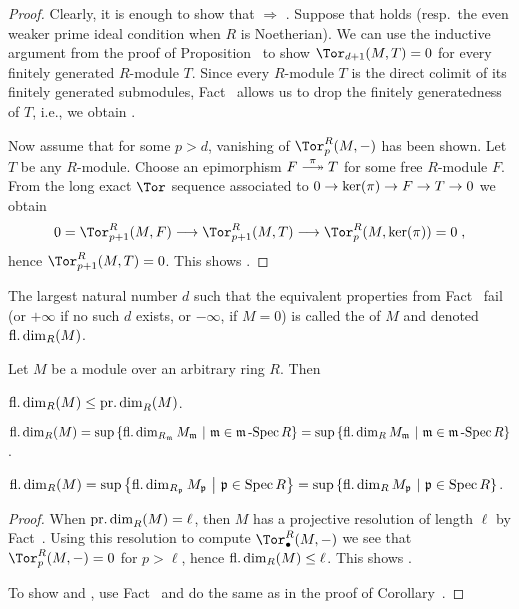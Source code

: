 \documentclass[a4paper,parskip=half,numbers=enddot, DIV=12]{scrreprt}
\begin{document}
\begin{proof}
	Clearly, it is enough to show that  $\Rightarrow$ . Suppose that  holds (resp.\ the even weaker prime ideal condition when $R$ is Noetherian). We can use the inductive argument from the proof of Proposition~ to show $\Tor_{d+1}(M,T)=0$ for every finitely generated $R$-module $T$. Since every $R$-module $T$ is the direct colimit of its finitely generated submodules, Fact~ allows us to drop the finitely generatedness of $T$, i.e., we obtain .
	
	Now assume that for some $p>d$, vanishing of $\Tor_p^R(M,-)$ has been shown. Let $T$ be any $R$-module. Choose an epimorphism $F\epimorphism[\pi]T$ for some free $R$-module $F$. From the long exact $\Tor$ sequence associated to $0\morphism \ker(\pi)\morphism F\morphism T\morphism 0$ we obtain
	\begin{align*}
		0=\Tor_{p+1}^R(M,F)\morphism\Tor_{p+1}^R(M,T)\morphism\Tor_p^R(M,\ker (\pi))=0\;,
	\end{align*}
	hence $\Tor_{p+1}^R(M,T)=0$. This shows .
\end{proof}
\begin{defi}
	The largest natural number $d$ such that the equivalent properties from Fact~ fail (or $+\infty$ if no such $d$ exists, or $-\infty$, if $M=0$) is called the  of $M$ and denoted $\operatorname{fl.dim}_R(M)$.
\end{defi}
\begin{fact}
	Let $M$ be a module over an arbitrary ring $R$. Then
	\begin{alphanumerate}
		\item $\operatorname{fl.dim}_R(M)\leq \operatorname{pr.dim}_R(M)$.
		\item $\operatorname{fl.dim}_R(M)=\sup\left\{\operatorname{fl.dim}_{R_{\mathfrak{m}}}M_{\mathfrak{m}}\ \middle|\ \mathfrak{m}\in\mathfrak{m}\operatorname{-Spec} R\right\}=\sup\left\{\operatorname{fl.dim}_RM_{\mathfrak{m}}\ \middle|\  \mathfrak{m}\in\mathfrak{m}\operatorname{-Spec} R\right\}$.
		\item $\operatorname{fl.dim}_R(M)=\sup\left\{\operatorname{fl.dim}_{R_{\mathfrak{p}}}M_{\mathfrak{p}}\ \middle|\  \mathfrak{p}\in\operatorname{Spec} R\right\}=\sup\left\{\operatorname{fl.dim}_RM_{\mathfrak{p}}\ \middle|\  \mathfrak{p}\in\operatorname{Spec} R\right\}$.
	\end{alphanumerate}
\end{fact}
\begin{proof}
	When $\operatorname{pr.dim}_R(M)=\ell$, then $M$ has a projective resolution of length $\ell$ by Fact~. Using this resolution to compute $\Tor_\bullet^R(M,-)$ we see that $\Tor_p^R(M,-)=0$ for $p>\ell$, hence $\operatorname{fl.dim}_R(M)\leq \ell$. This shows .
	
	To show  and , use Fact~ and do the same as in the proof of Corollary~.
\end{proof}
\end{document}
